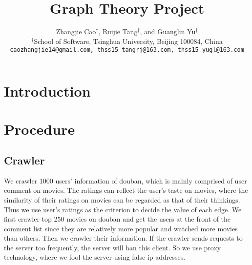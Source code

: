 \documentclass{article}
\title{Graph Theory Project}
\author{
Zhangjie Cao$^\dag$, Ruijie Tang$^\dag$, and Guanglin Yu$^\dag$\\
$^\dag$School of Software, Tsinghua University, Beijing 100084, China\\
\texttt{caozhangjie14@gmail.com, thss15\_tangrj@163.com, thss15\_yugl@163.com}\\
}
\begin{document}
\maketitle

\begin{abstract}

\end{abstract}

\section{Introduction}

\section{Procedure}
\subsection{Crawler}
We crawler 1000 users' information of douban, which is mainly comprised of user comment on movies. The ratings can reflect the user's taste on movies, where the similarity of their ratings on movies can be regarded as that of their thinkings. Thus we use user's ratings as the criterion to decide the value of each edge.
We first crawler top 250 movies on douban and get the users at the front of the comment list since they are relatively more popular and watched more movies than others. Then we crawler their information. 
If the crawler sends requests to the server too frequently, the server will ban this client. So we use proxy technology, where we fool the server using false ip addresses.
\end{document}

